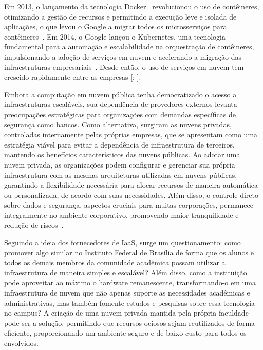 Em 2013, o lançamento da tecnologia Docker~\citep{DockerDocumentation} revolucionou o uso de contêineres, otimizando a gestão de recursos e permitindo a execução leve e isolada de aplicações, o que levou o Google a migrar todos os microsserviços para contêineres~\citep{HistoryOfContainers}. Em 2014, o Google lançou o Kubernetes, uma tecnologia fundamental para a automação e escalabilidade na orquestração de contêineres, impulsionando a adoção de serviços em nuvem e acelerando a migração das infraestruturas empresariais~\citep{CompaniesMigrateToAWS}. Desde então, o uso de serviços em nuvem tem crescido rapidamente entre as empresas [\citep{GrowthCompaniesInCloud_one}; \citep{GrowthCompaniesInCloud_two}].


Embora a computação em nuvem pública tenha democratizado o acesso a infraestruturas escaláveis, sua dependência de provedores externos levanta preocupações estratégicas para organizações com demandas específicas de segurança como bancos. Como alternativa, surgiram as nuvens privadas, controladas internamente pelas próprias empresas, que se apresentam como uma estratégia viável para evitar a dependência de infraestrutura de terceiros, mantendo os benefícios característicos das nuvens públicas. Ao adotar uma nuvem privada, as organizações podem configurar e gerenciar sua própria infraestrutura com as mesmas arquiteturas utilizadas em nuvens públicas, garantindo a flexibilidade necessária para alocar recursos de maneira automática ou personalizada, de acordo com suas necessidades. Além disso, o controle direto sobre dados e segurança, aspectos cruciais para muitas corporações, permanece integralmente no ambiente corporativo, promovendo maior tranquilidade e redução de riscos~\citep{privateCloudAdvantagesDisadvantages}.


Seguindo a ideia dos fornecedores de IaaS, surge um questionamento: como promover algo similar no Instituto Federal de Brasília de forma que os alunos e todos os demais membros da comunidade acadêmica possam utilizar a infraestrutura de maneira simples e escalável? Além disso, como a instituição pode aproveitar ao máximo o hardware remanescente, transformando-o em uma infraestrutura de nuvem que não apenas suporte as necessidades acadêmicas e administrativas, mas também fomente estudos e pesquisas sobre essa tecnologia no campus? A criação de uma nuvem privada mantida pela própria faculdade pode ser a solução, permitindo que recursos ociosos sejam reutilizados de forma eficiente, proporcionando um ambiente seguro e de baixo custo para todos os envolvidos.

